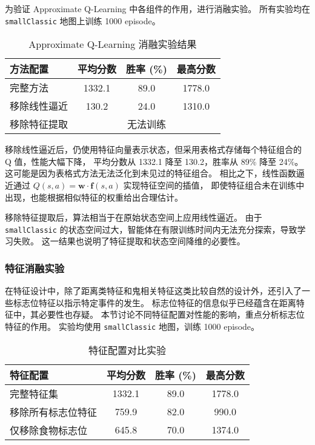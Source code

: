 为验证 Approximate Q-Learning 中各组件的作用，进行消融实验。
所有实验均在 \texttt{smallClassic} 地图上训练 1000 episode。

\begin{table}[h]
    \renewcommand{\arraystretch}{1.5}
    \setlength{\tabcolsep}{10pt}
    \centering
    \caption{Approximate Q-Learning 消融实验结果}
    \small
    \begin{tabular}{lccc}
        \toprule
        \textbf{方法配置} & \textbf{平均分数} & \textbf{胜率 (\%)} & \textbf{最高分数} \\
        \midrule
        完整方法 & 1332.1 & 89.0 & 1778.0 \\
        移除线性逼近 & 130.2 & 24.0 & 1310.0 \\
        移除特征提取 & \multicolumn{3}{c}{无法训练} \\
        \bottomrule
    \end{tabular}
    \label{tab:ablation_approx_q}
\end{table}


移除线性逼近后，仍使用特征向量表示状态，但采用表格式存储每个特征组合的 Q 值，性能大幅下降，
平均分数从 1332.1 降至 130.2，胜率从 89\% 降至 24\%。
这可能是因为表格式方法无法泛化到未见过的特征组合。
相比之下，线性函数逼近通过 $Q(s,a) = \mathbf{w} \cdot \mathbf{f}(s,a)$ 实现特征空间的插值，
即使特征组合未在训练中出现，也能根据相似特征的权重给出合理估计。

移除特征提取后，算法相当于在原始状态空间上应用线性逼近。
由于 \texttt{smallClassic} 的状态空间过大，智能体在有限训练时间内无法充分探索，导致学习失败。
这一结果也说明了特征提取和状态空间降维的必要性。

\subsubsection{特征消融实验}

在特征设计中，除了距离类特征和鬼相关特征这类比较自然的设计外，还引入了一些标志位特征以指示特定事件的发生。
标志位特征的信息似乎已经蕴含在距离特征中，其必要性也存疑。
本节讨论不同特征配置对性能的影响，重点分析标志位特征的作用。
实验均使用 \texttt{smallClassic} 地图，训练 1000 episode。

\begin{table}[h]
    \renewcommand{\arraystretch}{1.5}
    \setlength{\tabcolsep}{8pt}
    \centering
    \caption{特征配置对比实验}
    \small
    \begin{tabular}{lccc}
        \toprule
        \textbf{特征配置} & \textbf{平均分数} & \textbf{胜率 (\%)} & \textbf{最高分数} \\
        \midrule
        完整特征集 & 1332.1 & 89.0 & 1778.0 \\
        移除所有标志位特征 & 759.9 & 82.0 & 990.0 \\
        仅移除食物标志位 & 645.8 & 70.0 & 1374.0 \\
        \bottomrule
    \end{tabular}
    \label{tab:ablation_features}
\end{table}

